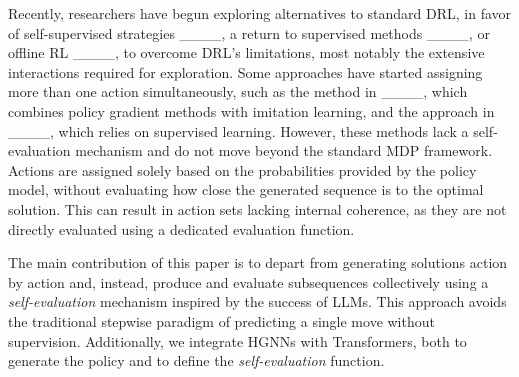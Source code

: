 Recently, researchers have begun exploring alternatives to standard DRL, in favor of self-supervised strategies ____, a return to supervised methods ____, or offline RL ____, to overcome DRL’s limitations, most notably the extensive interactions required for exploration. Some approaches have started assigning more than one action simultaneously, such as the method in ____, which combines policy gradient methods with imitation learning, and the approach in ____, which relies on supervised learning. However, these methods lack a self-evaluation mechanism and do not move beyond the standard MDP framework. Actions are assigned solely based on the probabilities provided by the policy model, without evaluating how close the generated sequence is to the optimal solution. This can result in action sets lacking internal coherence, as they are not directly evaluated using a dedicated evaluation function.

The main contribution of this paper is to depart from generating solutions action by action and, instead, produce and evaluate subsequences collectively using a \emph{self-evaluation} mechanism inspired by the success of LLMs. This approach avoids the traditional stepwise paradigm of predicting a single move without supervision. Additionally, we integrate HGNNs with Transformers, both to generate the policy and to define the \emph{self-evaluation} function.